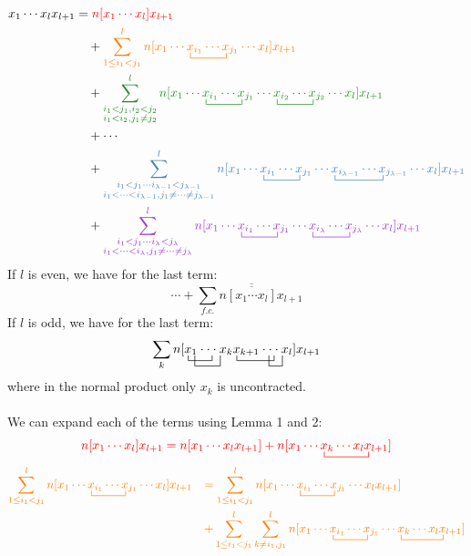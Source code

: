 \documentclass{article}
\newcommand{\ol}{\overline}
\newcommand{\ctr}{\bcontraction}
\newcommand{\cd}{\ensuremath{\cdots} }
\def\cb#1{{\color{blue}#1}}
\def\co#1{{\color{orange}#1}}
\def\cre#1{{\color{red}#1}}
\def\cg#1{{\color{green}#1}}
\def\cp#1{{\color{purple}#1}}
\begin{document}
\begin{align*}
x_1 \cd x_l x_{l + 1} 
&= \cre{n[x_1 \cd x_l ] x_{l + 1} } \\
& \quad +  \co{\sum_{1 \leq i_1 <  j_1}^l n[x_1 \cd \ctr{}{x}{{}_{i_1}\cd}{x} x_{i_1}  \cd x_{j_1}  \cd x_l ] x_{l + 1} } \\
& \quad +  \cg{ \sum_{\substack{i_1 < j_1,  i_2 < j_2 \\ i_1 < i_2, j_1 \neq j_2}}^l
n[x_1 \cd \ctr{}{x}{{}_{i_1}\cd}{x} x_{i_1}  \cd x_{j_1} \cd \ctr{}{x}{{}_{i_2}\cd}{x} x_{i_2}  \cd x_{j_2} \cd x_l ] x_{l + 1} } \\
 & \quad  +  \cd \\
& \quad + \cb{ \sum_{\substack{i_1 <  j_1 \cd  i_{\lambda - 1} < j_{\lambda - 1} \\ i_1 < \cd < i_{\lambda - 1}, j_1 \neq \cd \neq j_{\lambda-1}}}^l
n[x_1 \cd \ctr{}{x}{{}_{i_1}\cd}{x} x_{i_1}  \cd x_{j_1} \cd \ctr{}{x}{{}_{i_{\lambda -1} }\cd}{x} x_{i_{\lambda-1}}  \cd x_{j_{\lambda - 1}} \cd x_l ] x_{l + 1} } \\
& \quad + \cp{ \sum_{\substack{i_1 <  j_1 \cd  i_\lambda < j_\lambda \\ i_1 < \cd < i_\lambda, j_1 \neq \cd \neq j_\lambda}}^l
n[x_1 \cd \ctr{}{x}{{}_{i_1}\cd}{x} x_{i_1}  \cd x_{j_1} \cd \ctr{}{x}{{}_{i_\lambda}\cd}{x} x_{i_\lambda}  \cd x_{j_\lambda} \cd x_l ] x_{l + 1} } \\
\end{align*}
If $l$ is even, we have for the last term: 
\[ \cd + \sum_{f.c.} n\ol{\ol{[x_1\cd x_l]}}x_{l+1} \]
If $l$ is odd, we have for the last term: 
\[\sum_{k} n[  
\ctr{}{x}{{}_1 \cdot}{\cdot}
\ctr[2ex]{x}{{}_1 }{\cdot \cdot\cdot}{}
x_1 \cdot \cdot \cdot  x_k 
\ctr{}{x}{{}_{k+1} \cdot}{\cdot}{ {}}
\ctr[2ex]{x_{k + 1}  \cdot}{}{\cdot}{x}
x_{k + 1}  \cdot \cdot \cdot  x_l] x_{l+1} \]
where in the normal product only $x_k$ is uncontracted.\\ \\
We can expand each of the terms using Lemma 1 and 2: 
\begin{align*}
\cre{n[x_1 \cd x_l ] x_{l + 1} = n[x_1 \cd x_l  x_{l + 1} ] + n[x_1 \cd \ctr{}{x}{{}_k \cd x_l }{x} x_k \cd x_l  x_{l + 1} ]
} 
\end{align*}
\begin{align*}
\co{\sum_{1 \leq i_1 <  j_1}^l n[x_1 \cd \ctr{}{x}{{}_{i_1}\cd}{x} x_{i_1}  \cd x_{j_1}  \cd x_l ] x_{l + 1} } 
& \quad \co{ = \sum_{1 \leq i_1 <  j_1}^l n[x_1 \cd \ctr{}{x}{{}_{i_1}\cd}{x} x_{i_1}  \cd x_{j_1}  \cd x_l x_{l + 1}]  }\\
& \quad \co{ + \sum_{1 \leq i_1 <  j_1}^l \sum_{k \neq i_1, j_1}^l n[x_1 \cd \ctr{}{x}{{}_{i_1}\cd}{x} x_{i_1}  \cd x_{j_1}  \cd \ctr{}{x}{{}_k \cd  x_l}{x} x_k \cd  x_l x_{l + 1}]  }
\end{align*}
\end{document}
